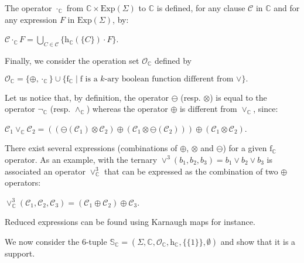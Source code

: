 \documentclass{article}
\newcommand{\ocap}{\otimes}
\newcommand{\ocup}{\oplus}
\newcommand{\oneg}{\ominus}
\begin{document}
    The operator $\cdot_{\mathbb{C}}$ from $\mathbb{C}\times \mathrm{Exp}(\Sigma)$ to $\mathbb{C}$ is defined, for any clause $\mathcal{C}$ in $\mathbb{C}$ and for any expression $F$ in $\mathrm{Exp}(\Sigma)$, by:
    
    \centerline{
      $\mathcal{C}\cdot_{\mathbb{C}} F=\bigcup_{C\in \mathcal{C}} \{\mathrm{h}_{\mathbb{C}}(\{C\})\cdot F\}$.
    }
    
    Finally, we consider the operation  set $\mathcal{O}_{\mathbb{C}}$ defined by 
    
    \centerline{
    $\mathcal{O}_{\mathbb{C}}=
\{\ocup,\cdot_{\mathbb{C}}\}
\cup
\{\mathrm{f}_{\mathbb{C}}\mid \mathrm{f} \text{ is a }k\text{-ary boolean function different from }\vee\}
.$}
      
     Let us notice that, by definition, the operator $\oneg$ (resp. $\ocap$) is equal to  the operator $\neg_{\mathbb{C}}$ (resp. $\wedge_{\mathbb{C}}$) whereas the operator $\ocup$ is different from $\vee_{\mathbb{C}}$, since:
     
     \centerline{ $\mathcal{C}_1\vee_{\mathbb{C}} \mathcal{C}_2= ((\oneg(\mathcal{C}_1) \ocap \mathcal{C}_2) \ocup (\mathcal{C}_1 \ocap \oneg(\mathcal{C}_2))) \ocup (\mathcal{C}_1 \ocap \mathcal{C}_2)$.}
     
     There exist several expressions (combinations of $\ocup$, $\ocap$ and $\oneg$) for a given $\mathrm{f}_{\mathbb{C}}$ operator. As an example, with the ternary $\vee^3(b_1,b_2,b_3)=b_1\vee b_2 \vee b_3$ is associated an operator $\vee^3_{\mathbb{C}}$ that can be expressed as the combination of two $\ocup$ operators:

    \centerline{
      $\vee^3_{\mathbb{C}}(\mathcal{C}_1,\mathcal{C}_2,\mathcal{C}_3)=(\mathcal{C}_1 \ocup \mathcal{C}_2)\ocup \mathcal{C}_3$.
    }
     
     Reduced expressions can be found using Karnaugh maps for instance.
    
     We now consider the $6$-tuple $\mathbb{S}_{\mathbb{C}}=(\Sigma,\mathbb{C}, \mathcal{O}_{\mathbb{C}},\mathrm{h}_{\mathbb{C}},\{\{1\}\},\emptyset)$ and show that it is a support.
    
\end{document}
